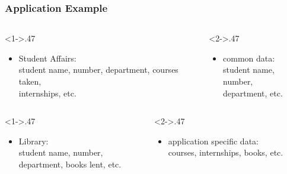 \documentclass[dvipsnames]{beamer}
\theoremstyle{plain}
\begin{document}
\begin{frame}
  \frametitle{Application Example}

  \begin{example}
    \begin{columns}[t]
      \begin{column}<1->{.47\textwidth}
      \begin{itemize}
        \item Student Affairs:\\
          student name, number,
          department, courses taken,\\
          internships, etc.
      \end{itemize}
      \end{column}

      \begin{column}<2->{.47\textwidth}
      \begin{itemize}
        \item common data:\\
          student name, number,\\
          department, etc.
      \end{itemize}
      \end{column}
    \end{columns}

    \begin{columns}[t]
      \begin{column}<1->{.47\textwidth}
        \begin{itemize}
          \item Library:\\
            student name, number,\\
            department, books lent, etc.
        \end{itemize}
      \end{column}

      \begin{column}<2->{.47\textwidth}
        \begin{itemize}
          \item application specific data:\\
            courses, internships, books, etc.
        \end{itemize}
      \end{column}
    \end{columns}
  \end{example}
\end{frame}
\end{document}
